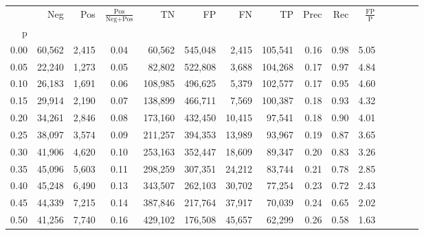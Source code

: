 \begin{tabular}{rrrcrrrrrrrrrrr}
\toprule
{} &     Neg &     Pos & $\frac{\text{Pos}}{\text{Neg}+\text{Pos}}$ &       TN &       FP &       FN &       TP &  Prec &   Rec & $\frac{\text{FP}}{\text{P}}$ \\
p    &         &         &                                            &          &          &          &          &       &       &                              \\
\midrule
0.00 &  60,562 &   2,415 &                                       0.04 &   60,562 &  545,048 &    2,415 &  105,541 &  0.16 &  0.98 &                         5.05 \\
0.05 &  22,240 &   1,273 &                                       0.05 &   82,802 &  522,808 &    3,688 &  104,268 &  0.17 &  0.97 &                         4.84 \\
0.10 &  26,183 &   1,691 &                                       0.06 &  108,985 &  496,625 &    5,379 &  102,577 &  0.17 &  0.95 &                         4.60 \\
0.15 &  29,914 &   2,190 &                                       0.07 &  138,899 &  466,711 &    7,569 &  100,387 &  0.18 &  0.93 &                         4.32 \\
0.20 &  34,261 &   2,846 &                                       0.08 &  173,160 &  432,450 &   10,415 &   97,541 &  0.18 &  0.90 &                         4.01 \\
0.25 &  38,097 &   3,574 &                                       0.09 &  211,257 &  394,353 &   13,989 &   93,967 &  0.19 &  0.87 &                         3.65 \\
0.30 &  41,906 &   4,620 &                                       0.10 &  253,163 &  352,447 &   18,609 &   89,347 &  0.20 &  0.83 &                         3.26 \\
0.35 &  45,096 &   5,603 &                                       0.11 &  298,259 &  307,351 &   24,212 &   83,744 &  0.21 &  0.78 &                         2.85 \\
0.40 &  45,248 &   6,490 &                                       0.13 &  343,507 &  262,103 &   30,702 &   77,254 &  0.23 &  0.72 &                         2.43 \\
0.45 &  44,339 &   7,215 &                                       0.14 &  387,846 &  217,764 &   37,917 &   70,039 &  0.24 &  0.65 &                         2.02 \\
0.50 &  41,256 &   7,740 &                                       0.16 &  429,102 &  176,508 &   45,657 &   62,299 &  0.26 &  0.58 &                         1.63 \\

\end{tabular}
